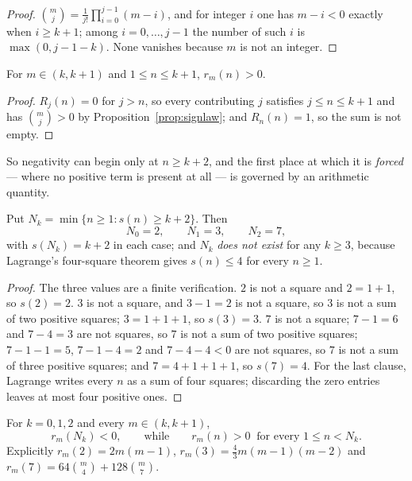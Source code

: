 \begin{proof}
$\binom mj=\frac1{j!}\prod_{i=0}^{j-1}(m-i)$, and for integer $i$ one has
$m-i<0$ exactly when $i\ge k+1$; among $i=0,\dots,j-1$ the number of such $i$ is
$\max(0,j-1-k)$. None vanishes because $m$ is not an integer.
\end{proof}

\begin{proposition}\label{prop:free}
For $m\in(k,k+1)$ and $1\le n\le k+1$, $r_m(n)>0$.
\end{proposition}

\begin{proof}
$R_j(n)=0$ for $j>n$, so every contributing $j$ satisfies $j\le n\le k+1$ and has
$\binom mj>0$ by Proposition~\ref{prop:signlaw}; and $R_n(n)=1$, so the sum is
not empty.
\end{proof}

So negativity can begin only at $n\ge k+2$, and the first place at which it is
\emph{forced} --- where no positive term is present at all --- is governed by an
arithmetic quantity.

\begin{proposition}\label{prop:Nk}
Put $N_k=\min\{n\ge1:s(n)\ge k+2\}$. Then
\begin{equation}\label{eq:Nk}
 N_0=2,\qquad N_1=3,\qquad N_2=7,
\end{equation}
with $s(N_k)=k+2$ in each case; and $N_k$ \emph{does not exist} for any $k\ge3$,
because Lagrange's four-square theorem \cite[Thm.~369]{HardyWright} gives
$s(n)\le4$ for every $n\ge1$.
\end{proposition}

\begin{proof}
The three values are a finite verification. $2$ is not a square and $2=1+1$, so
$s(2)=2$. $3$ is not a square, and $3-1=2$ is not a square, so $3$ is not a sum
of two positive squares; $3=1+1+1$, so $s(3)=3$. $7$ is not a square; $7-1=6$ and
$7-4=3$ are not squares, so $7$ is not a sum of two positive squares;
$7-1-1=5$, $7-1-4=2$ and $7-4-4<0$ are not squares, so $7$ is not a sum of three
positive squares; and $7=4+1+1+1$, so $s(7)=4$. For the last clause, Lagrange
writes every $n$ as a sum of four squares; discarding the zero entries leaves at
most four positive ones.
\end{proof}

\begin{proposition}\label{prop:forced}
For $k=0,1,2$ and every $m\in(k,k+1)$,
\begin{equation}\label{eq:forced}
 r_m(N_k)<0,\qquad\text{while}\qquad r_m(n)>0\ \text{ for every }1\le n<N_k .
\end{equation}
Explicitly $r_m(2)=2m(m-1)$, $r_m(3)=\frac43m(m-1)(m-2)$ and
$r_m(7)=64\binom m4+128\binom m7$.
\end{proposition}

